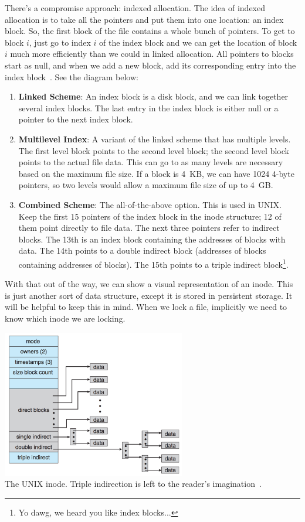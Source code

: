 \documentclass[a4paper]{report}
\begin{document}
There's a compromise approach: indexed allocation. The idea of indexed allocation is to take all the pointers and put them into one location: an index block. So, the first block of the file contains a whole bunch of pointers. To get to block $i$, just go to index $i$ of the index block and we can get the location of block $i$ much more efficiently than we could in linked allocation. All pointers to blocks start as null, and when we add a new block, add its corresponding entry into the index block~\cite{osc}. See the diagram below:

\begin{enumerate}
	\item \textbf{Linked Scheme}: An index block is a disk block, and we can link together several index blocks. The last entry in the index block is either null or a pointer to the next index block.
	\item \textbf{Multilevel Index}: A variant of the linked scheme that has multiple levels. The first level block points to the second level block; the second level block points to the actual file data. This can go to as many levels are necessary based on the maximum file size. If a block is 4~KB, we can have 1024 4-byte pointers, so two levels would allow a maximum file size of up to 4~GB.
	\item \textbf{Combined Scheme}: The all-of-the-above option. This is used in UNIX. Keep the first 15 pointers of the index block in the inode structure; 12 of them point directly to file data. The next three pointers refer to indirect blocks. The 13th is an index block containing the addresses of blocks with data. The 14th points to a double indirect block (addresses of blocks containing addresses of blocks). The 15th points to a triple indirect block\footnote{Yo dawg, we heard you like index blocks...}.
\end{enumerate}

With that out of the way, we can show a visual representation of an inode. This is just another sort of data structure, except it is stored in persistent storage. It will be helpful to keep this in mind. When we lock a file, implicitly we need to know which inode we are locking.

\begin{center}
	\includegraphics[width=0.6\textwidth]{images/unix-inode.png}\\
	The UNIX inode. Triple indirection is left to the reader's imagination~\cite{osc}.
\end{center}
\end{document}
